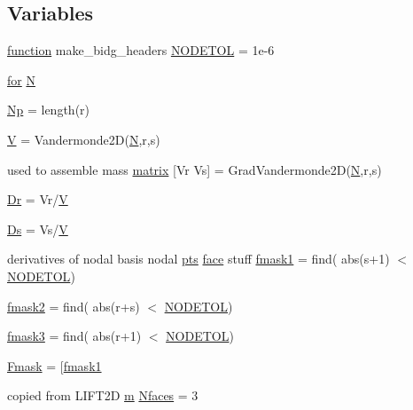 \subsection*{Variables}
\begin{DoxyCompactItemize}
\item 
\hyperlink{a00611_a2420833d971716e9bab41cc9fb3abba1}{function} make\+\_\+bidg\+\_\+headers \hyperlink{a01014_a459274f44c959d3b6466dbf5c40c6931}{N\+O\+D\+E\+T\+OL} = 1e-\/6
\item 
\hyperlink{a00623_ad1e7380d51df1e0043d24d3c8a860e0a}{for} \hyperlink{a01014_a8a9fa6faadbf3c485ecdc832c0f78989}{N}
\item 
\hyperlink{a01014_abe50207e56666a60c81e2a58f522eea3}{Np} = length(r)
\item 
\hyperlink{a01014_ac0055fa4cdc19a2690bfee3643413a7d}{V} = Vandermonde2D(\hyperlink{a00473_a5b9c4563028063ee53b517cce9aa701b}{N},r,s)
\item 
used to assemble mass \hyperlink{a01014_af07ff1035f34d77764ff516f110e6832}{matrix} \mbox{[}Vr Vs\mbox{]} = Grad\+Vandermonde2D(\hyperlink{a00473_a5b9c4563028063ee53b517cce9aa701b}{N},r,s)
\item 
\hyperlink{a01014_aa3f5ebfc6bdc8e458334129d39b52461}{Dr} = Vr/\hyperlink{a00575_af658e24e5ad7935911c432c5c02d895c}{V}
\item 
\hyperlink{a01014_ad9a5661d9c2ea85b3143c8ecb7127d5d}{Ds} = Vs/\hyperlink{a00575_af658e24e5ad7935911c432c5c02d895c}{V}
\item 
derivatives of nodal basis nodal \hyperlink{a00473_a7d2fb616b76863109aa80a7ffdfad72b}{pts} \hyperlink{a00611_ac4ec0037ba529da25bf084669a45f60c}{face} stuff \hyperlink{a01014_a1a1dec21df6e8b9d02462f97b957473d}{fmask1} = find( abs(s+1) $<$ \hyperlink{a00575_a409781c62c346e9048df00ae7d289582}{N\+O\+D\+E\+T\+OL})\textquotesingle{}
\item 
\hyperlink{a01014_a2db7941f6935f48a7799d8214a5da8e7}{fmask2} = find( abs(r+s) $<$ \hyperlink{a00575_a409781c62c346e9048df00ae7d289582}{N\+O\+D\+E\+T\+OL})\textquotesingle{}
\item 
\hyperlink{a01014_afa6c03554970806d170ae51e45e92765}{fmask3} = find( abs(r+1) $<$ \hyperlink{a00575_a409781c62c346e9048df00ae7d289582}{N\+O\+D\+E\+T\+OL})\textquotesingle{}
\item 
\hyperlink{a01014_a9d248ff3c701af57ed3e241d735bd034}{Fmask} = \mbox{[}\hyperlink{a00575_a94fc3ab9217cab318ada4ca502b10620}{fmask1}
\item 
copied from L\+I\+F\+T2D \hyperlink{a00575_ab780b65adc28bca17f186bf3eebfb21d}{m} \hyperlink{a01014_a65426726e39e9a3bb90febe7f32febdb}{Nfaces} = 3

\end{DoxyCompactItemize}
